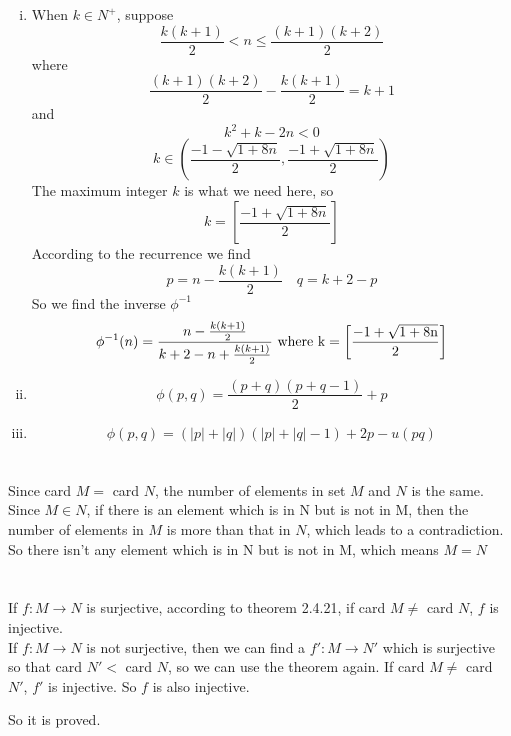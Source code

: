 \documentclass{article}
\begin{document}
\begin{enumerate}[i)]
\item
When $k\in N^+$, suppose
$$\frac{k(k+1)}{2}<n\leqslant\frac{(k+1)(k+2)}{2}$$
where
$$\frac{(k+1)(k+2)}{2}-\frac{k(k+1)}{2}=k+1$$
and
$$k^2+k-2n<0$$
$$k\in\left(\frac{-1-\sqrt{1+8n}}{2},\frac{-1+\sqrt{1+8n}}{2}\right)$$
The maximum integer $k$ is what we need here, so
$$k=\left[\frac{-1+\sqrt{1+8n}}{2}\right]$$
According to the recurrence we find
$$p=n-\frac{k(k+1)}{2}\quad q=k+2-p$$
So we find the inverse $\phi^{-1}$
$$\phi^{-1}(n)=\frac{n-\frac{k(k+1)}{2}}{k+2-n+\frac{k(k+1)}{2}}\ \rm{where}\ k=\left[\frac{-1+\sqrt{1+8n}}{2}\right]$$

\item
$$\phi(p,q)=\frac{(p+q)(p+q-1)}{2}+p$$

\item
$$\phi(p,q)=(|p|+|q|)(|p|+|q|-1)+2p-u(pq)$$
\end{enumerate}

\section{}

\section{}
Since card $M=$ card $N$, the number of elements in set $M$ and $N$ is the same.\\

Since $M\in N$, if there is an element which is in N but is not in M, then the number of elements in $M$ is more than that in $N$, which leads to a contradiction.\\

So there isn't any element which is in N but is not in M, which means $M=N$

\section{}
If $f:M\to N$ is surjective, according to theorem 2.4.21, if card $M\neq$ card $N$, $f$ is injective.\\

If $f:M\to N$ is not surjective, then we can find a $f':M\to N'$ which is surjective so that card $N'<$ card $N$, so we can use the theorem again. If card $M\neq$ card $N'$, $f'$ is injective. So $f$ is also injective.

So it is proved.
\end{document}
